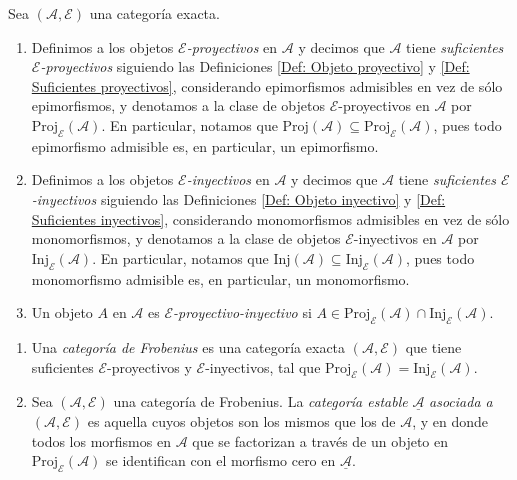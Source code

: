 \documentclass[tesis]{subfiles}
\begin{document}
\begin{Def}\label{Def: Objetos E-proyectivos y E-inyectivos en categorías exactas}
    Sea $(\mathscr{A},\mathscr{E})$ una categoría exacta.

    \begin{enumerate}[label=(\alph*)]
    
        \item Definimos a los objetos \emph{$\mathscr{E}$-proyectivos} en $\mathscr{A}$ y decimos que $\mathscr{A}$ tiene \emph{suficientes $\mathscr{E}$-proyectivos} siguiendo las Definiciones \ref{Def: Objeto proyectivo} y \ref{Def: Suficientes proyectivos}, considerando epimorfismos admisibles en vez de sólo epimorfismos, y denotamos a la clase de objetos $\mathscr{E}$-proyectivos en $\mathscr{A}$ por $\text{Proj}_\mathscr{E}(\mathscr{A})$. En particular, notamos que $\text{Proj}(\mathscr{A})\subseteq\text{Proj}_\mathscr{E}(\mathscr{A})$, pues todo epimorfismo admisible es, en particular, un epimorfismo.

        \item Definimos a los objetos \emph{$\mathscr{E}$-inyectivos} en $\mathscr{A}$ y decimos que $\mathscr{A}$ tiene \emph{suficientes $\mathscr{E}$-inyectivos} siguiendo las Definiciones \ref{Def: Objeto inyectivo} y \ref{Def: Suficientes inyectivos}, considerando monomorfismos admisibles en vez de sólo monomorfismos, y denotamos a la clase de objetos $\mathscr{E}$-inyectivos en $\mathscr{A}$ por $\text{Inj}_\mathscr{E}(\mathscr{A})$. En particular, notamos que $\text{Inj}(\mathscr{A})\subseteq\text{Inj}_\mathscr{E}(\mathscr{A})$, pues todo monomorfismo admisible es, en particular, un monomorfismo.

        \item Un objeto $A$ en $\mathscr{A}$ es \emph{$\mathscr{E}$-proyectivo-inyectivo} si $A\in\text{Proj}_\mathscr{E}(\mathscr{A})\cap\text{Inj}_\mathscr{E}(\mathscr{A})$.

    \end{enumerate}
\end{Def}

\begin{Def}\label{Def: Categoría de Frobenius}\leavevmode
    
    \begin{enumerate}[label=(\alph*)]
    
        \item Una \emph{categoría de Frobenius} es una categoría exacta $(\mathscr{A},\mathscr{E})$ que tiene suficientes $\mathscr{E}$-proyectivos y $\mathscr{E}$-inyectivos, tal que $\text{Proj}_\mathscr{E}(\mathscr{A}) = \text{Inj}_\mathscr{E}(\mathscr{A})$. 

        \item Sea $(\mathscr{A},\mathscr{E})$ una categoría de Frobenius. La \emph{categoría estable} $\underline{\mathscr{A}}$ \emph{asociada a} $(\mathscr{A},\mathscr{E})$ es aquella cuyos objetos son los mismos que los de $\mathscr{A}$, y en donde todos los morfismos en $\mathscr{A}$ que se factorizan a través de un objeto en $\text{Proj}_\mathscr{E}(\mathscr{A})$ se identifican con el morfismo cero en $\underline{\mathscr{A}}$.
    \end{enumerate}
\end{Def}
\end{document}
